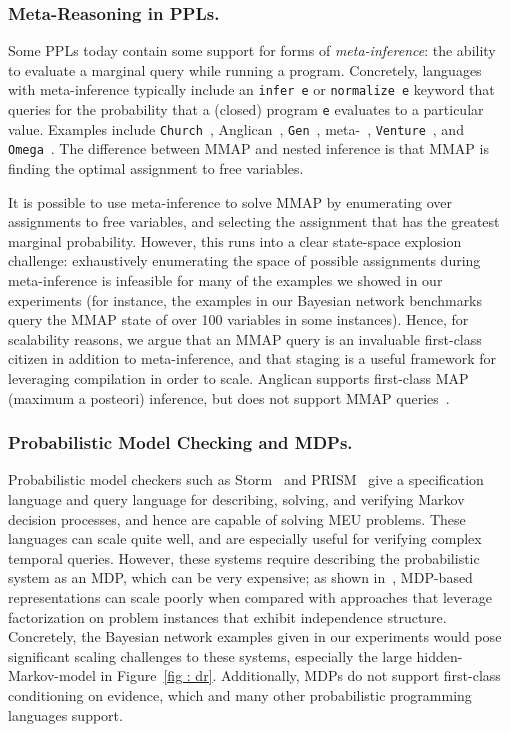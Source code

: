 \subsubsection*{Meta-Reasoning in PPLs.}
Some PPLs today contain some support for forms of \emph{meta-inference}: the
ability to evaluate a marginal query while running a program.  Concretely,
languages with meta-inference typically include an \texttt{infer e} or
\texttt{normalize e} keyword that queries for the probability that a (closed)
program \texttt{e} evaluates to a particular value.
Examples include
\texttt{Church}~\citep{goodman2008church},
Anglican~\citep{tolpin2015probabilistic}, \texttt{Gen}~\cite{cusumano2019gen},
meta-\problog{}~\citep{mantadelis2011nesting},
\texttt{Venture}~\citep{mansinghka2014venture}, and
\texttt{Omega}~\citep{tavares2019random}.
The difference between MMAP and nested inference is that MMAP is finding the
optimal assignment to free variables.

It is possible to use meta-inference
to solve MMAP by enumerating over assignments to free variables,
and selecting the assignment that has the greatest marginal probability.
However, this runs into a clear state-space explosion challenge:
exhaustively enumerating the space of possible assignments during meta-inference
is infeasible for many of the examples we showed in our experiments (for
instance, the examples in our Bayesian network benchmarks query the MMAP state
of over 100 variables in some instances). Hence, for scalability reasons, we
argue that an MMAP query is an invaluable first-class citizen in addition to
meta-inference, and that staging is a useful framework for leveraging
compilation in order to scale. Anglican supports first-class MAP (maximum a posteori) inference, but does not
support MMAP queries~\cite{tolpin2015maximum}.

\subsubsection*{Probabilistic Model Checking and MDPs.} Probabilistic model checkers
such as Storm~\citep{dehnert2017storm} and PRISM~\citep{kwiatkowska2002prism} give
a specification language and query language for describing, solving, and
verifying Markov decision processes, and hence are capable of solving MEU
problems. These languages can scale quite well, and are especially useful for
verifying complex temporal queries. However, these systems require describing
the probabilistic system as an MDP, which can be very expensive; as shown in~\citet{holtzen2021model}, MDP-based
representations can scale poorly when compared with approaches that leverage
factorization on problem instances that exhibit independence structure.
Concretely, the Bayesian network examples given in our experiments would pose
significant scaling challenges to these systems, especially the large
hidden-Markov-model in Figure~\ref{fig : dr}. Additionally, MDPs do not
support first-class conditioning on evidence, which \dappl{} and many
other probabilistic programming languages support.


